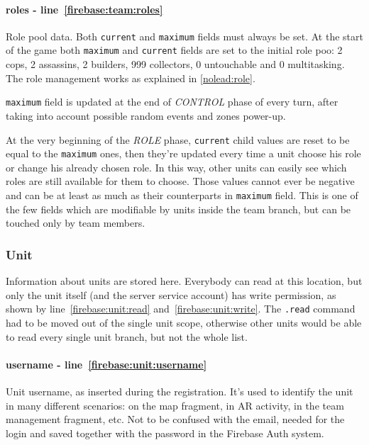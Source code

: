 				\paragraph{roles - line~\ref{firebase:team:roles}}
				Role pool data. Both \lstinline|current| and \lstinline|maximum| fields must always be set. At the start of the game both \lstinline|maximum| and \lstinline|current| fields are set to the initial role poo: 2 cops, 2 assassins, 2 builders, 999 collectors, 0 untouchable and 0 multitasking.
				The role management works as explained in \autoref{nolead:role}.
				
				\lstinline|maximum| field is updated at the end of \emph{CONTROL} phase of every turn, after taking into account possible random events and zones power-up.
				
				At the very beginning of the \emph{ROLE} phase, \lstinline|current| child values are reset to be equal to the \lstinline|maximum| ones, then they're updated every time a unit choose his role or change his already chosen role. In this way, other units can easily see which roles are still available for them to choose.
				Those values cannot ever be negative and can be at least as much as their counterparts in \lstinline|maximum| field.
				This is one of the few fields which are modifiable by units inside the team branch, but can be touched only by team members.
			
			\subsubsection{Unit}
			
				
			
				Information about units are stored here.
				Everybody can read at this location, but only the unit itself (and the server service account) has write permission, as shown by line~\ref{firebase:unit:read} and~\ref{firebase:unit:write}.
				The \lstinline|.read| command had to be moved out of the single unit scope, otherwise other units would be able to read every single unit branch, but not the whole list.
			
				\paragraph{username - line~\ref{firebase:unit:username}}
				Unit username, as inserted during the registration. It's used to identify the unit in many different scenarios: on the map fragment, in AR activity, in the team management fragment, etc. Not to be confused with the email, needed for the login and saved together with the password in the Firebase Auth system.
			
